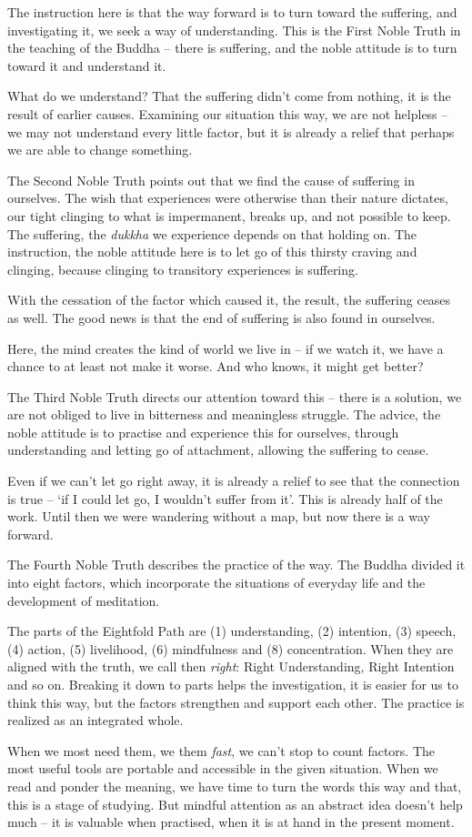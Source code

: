 The instruction here is that the way forward is to turn toward the
suffering, and investigating it, we seek a way of understanding. This is
the First Noble Truth in the teaching of the Buddha -- there is
suffering, and the noble attitude is to turn toward it and understand
it.

What do we understand? That the suffering didn't come from nothing, it
is the result of earlier causes. Examining our situation this way, we
are not helpless -- we may not understand every little factor, but it is
already a relief that perhaps we are able to change something.

The Second Noble Truth points out that we find the cause of suffering in
ourselves. The wish that experiences were otherwise than their nature
dictates, our tight clinging to what is impermanent, breaks up, and not
possible to keep. The suffering, the \emph{dukkha} we experience depends
on that holding on. The instruction, the noble attitude here is to let
go of this thirsty craving and clinging, because clinging to transitory
experiences is suffering.

With the cessation of the factor which caused it, the result, the
suffering ceases as well. The good news is that the end of suffering is
also found in ourselves.

Here, the mind creates the kind of world we live in -- if we watch it,
we have a chance to at least not make it worse. And who knows, it might
get better?

The Third Noble Truth directs our attention toward this -- there is a
solution, we are not obliged to live in bitterness and meaningless
struggle. The advice, the noble attitude is to practise and experience
this for ourselves, through understanding and letting go of attachment,
allowing the suffering to cease.

Even if we can't let go right away, it is already a relief to see that
the connection is true -- `if I could let go, I wouldn't suffer from
it'. This is already half of the work. Until then we were wandering
without a map, but now there is a way forward.

The Fourth Noble Truth describes the practice of the way. The Buddha
divided it into eight factors, which incorporate the situations of
everyday life and the development of meditation.

The parts of the Eightfold Path are (1) understanding, (2) intention,
(3) speech, (4) action, (5) livelihood, (6) mindfulness and (8)
concentration. When they are aligned with the truth, we call then
\emph{right}: Right Understanding, Right Intention and so on. Breaking
it down to parts helps the investigation, it is easier for us to think
this way, but the factors strengthen and support each other. The
practice is realized as an integrated whole.

When we most need them, we them \emph{fast}, we can't stop to count
factors. The most useful tools are portable and accessible in the given
situation. When we read and ponder the meaning, we have time to turn the
words this way and that, this is a stage of studying. But mindful
attention as an abstract idea doesn't help much -- it is valuable when
practised, when it is at hand in the present moment.
